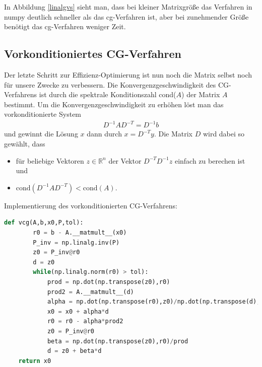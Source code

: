 In Abbildung \ref{linalgvs}  sieht man, dass bei kleiner Matrixgröße das Verfahren in numpy deutlich schneller als das cg-Verfahren ist, aber bei zunehmender Größe benötigt das cg-Verfahren weniger Zeit.

\subsection{Vorkonditioniertes CG-Verfahren}
Der letzte Schritt zur Effizienz-Optimierung ist nun noch die Matrix selbst noch für unsere Zwecke zu verbessern.
Die Konvergenzgeschwindigkeit des CG-Verfahrens ist durch die spektrale Konditionszahl cond($A$) der Matrix $A$ bestimmt.
Um die Konvergenzgeschwindigkeit zu erhöhen löst man das vorkonditionierte System
\begin{align*}
  D^{-1}AD^{-T} = D^{-1}b
\end{align*}
und gewinnt die Lösung $x$ dann durch $x = D^{-T}y$. Die Matrix $D$ wird dabei so gewählt, dass
\begin{itemize}
\item für beliebige Vektoren $z \in \mathbb{R}^n$ der Vektor $D^{-T}D^{-1}z$ einfach zu berechen ist und
\item $\text{cond}(D^{-1}AD^{-T}) < \text{cond}(A)$.
\end{itemize}
Implementierung des vorkonditionierten CG-Verfahrens:
\begin{lstlisting}[language=Python]
    def vcg(A,b,x0,P,tol):
        r0 = b - A.__matmult__(x0)
        P_inv = np.linalg.inv(P)
        z0 = P_inv@r0
        d = z0
        while(np.linalg.norm(r0) > tol):
            prod = np.dot(np.transpose(z0),r0)
            prod2 = A.__matmult__(d)
            alpha = np.dot(np.transpose(r0),z0)/np.dot(np.transpose(d),prod2)
            x0 = x0 + alpha*d
            r0 = r0 - alpha*prod2
            z0 = P_inv@r0
            beta = np.dot(np.transpose(z0),r0)/prod
            d = z0 + beta*d
    return x0
\end{lstlisting}

